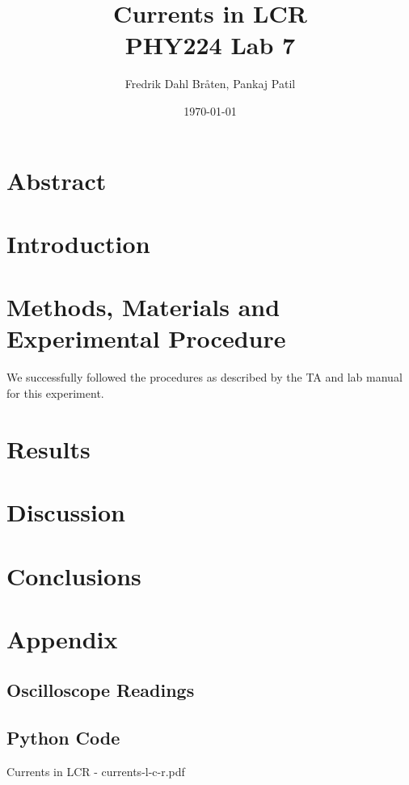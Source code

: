 \documentclass[letterpaper,12pt]{article}
\begin{document}
\title{%
Currents in LCR \\
\large PHY224 Lab 7}
\author{Fredrik Dahl Bråten, Pankaj Patil}
\date{\today}
\maketitle

\section{Abstract}

\section{Introduction}


\section{Methods, Materials and Experimental Procedure}

We successfully followed the procedures as described by the TA and lab manual \cite{lab-manual-ex6} for this experiment.

\section{Results}



\section{Discussion}

\section{Conclusions}

\pagebreak

\appendix

\section{Appendix}

\subsection{Oscilloscope Readings}

\pagebreak

\subsection{Python Code}


\pagebreak

\begin{thebibliography}{99}

 Currents in LCR - currents-l-c-r.pdf

\end{thebibliography}
\end{document}
